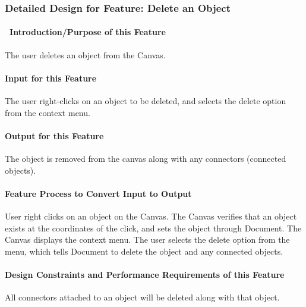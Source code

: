 \documentclass[twoside,letterpaper]{article}
\begin{document}
{\clearpage



% 
%

\subsubsection{Detailed Design for Feature: Delete an Object}

\paragraph[\ Introduction/Purpose of this Feature]
{\ Introduction/Purpose of this Feature}
{
The user deletes an object from the Canvas.
}

\paragraph[Input for this Feature]{Input for this Feature}
{
The user right-clicks on an object to be deleted, and selects the delete option from the context menu.
}

\paragraph{Output for this Feature}
{
The object is removed from the canvas along with any connectors (connected objects).
}

\paragraph{Feature Process to Convert Input to Output}
{
User right clicks on an object on the Canvas. The Canvas verifies that an object exists at the coordinates of the click, and sets the object through Document.  The Canvas displays the context menu.  The user selects the delete option from the menu, which tells Document to delete the object and any connected objects.
}

\paragraph{Design Constraints and Performance Requirements of this Feature}
{
All connectors attached to an object will be deleted along with that object.
}
\bigskip
\bigskip

}
\end{document}
